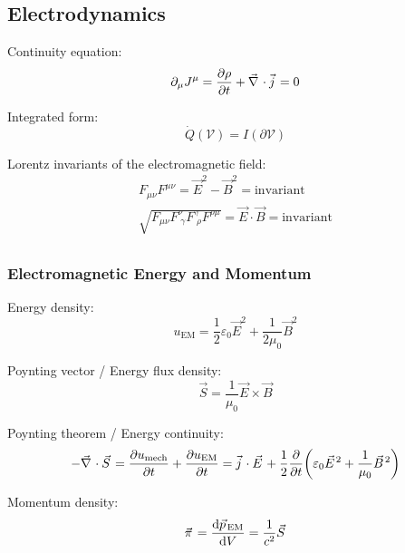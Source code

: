 	\subsection{Electrodynamics}
		\noindent
		Continuity equation:
		\begin{equation}
			\partial_\mu J^\mu = \pdv{\rho}{t} + \Nabla\cdot\vec{j} = 0
		\end{equation}

		\noindent
		Integrated form:
		\begin{equation}
			\dot{Q}(\mathcal{V}) = I(\partial\mathcal{V})
		\end{equation}

		\noindent
		Lorentz invariants of the electromagnetic field:
		\begin{equation}
			\begin{aligned}
				F_{\mu\nu} F^{\mu\nu} = \vec{E}^2 - \vec{B}^2 = \mathrm{invariant} \\
				\sqrt{ F_{\mu\nu} F^{\nu}_{\;\gamma} F^{\gamma}_{\;\rho} F^{\rho\mu}} = \vec{E}\cdot \vec{B} = \mathrm{invariant} \\
			\end{aligned}
		\end{equation}

		\subsubsection{Electromagnetic Energy and Momentum}
			\noindent
			Energy density:
			\begin{equation}
				u_{\text{EM}}=\frac{1}{2}\varepsilon_0 \vec{E}^2+\frac{1}{2\mu_0}\vec{B}^2
			\end{equation}

			\noindent
			Poynting vector / Energy flux density:
			\begin{equation}
				\vec{S} = \frac{1}{\mu_0}\vec{E}\times\vec{B}
			\end{equation}

			\noindent
			Poynting theorem / Energy continuity:
			\begin{equation}
				-\Nabla\cdot\vec{S}
				= \pdv{u_{\mathrm{mech}}}{t} + \pdv{u_{\text{EM}}}{t}
				= \vec{j}\cdot\vec{E} + \frac{1}{2}\pdv{t}\qty(\varepsilon_0\vec{E}^2 + \frac{1}{\mu_0}\vec{B}^2)
			\end{equation}

			\noindent
			Momentum density:
			\begin{equation}
				\vec{\pi} = \dv{\vec{p}_{\text{EM}}}{V} = \frac{1}{c^2}\vec{S}
			\end{equation}

